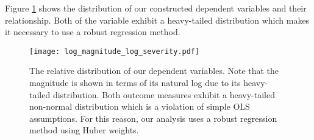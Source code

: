 Figure \ref{log_magnitude_log_severity} shows the distribution of our constructed dependent variables and their relationship. Both of the variable exhibit a heavy-tailed distribution which makes it necessary to use a robust regression method.

\begin{figure}
\centering
\texttt{[image: log\_magnitude\_log\_severity.pdf]}
\label{log_magnitude_log_severity}
\caption{The relative distribution of our dependent variables. Note that the magnitude is shown in terms of its natural log due to its heavy-tailed distribution. Both outcome measures exhibit a heavy-tailed non-normal distribution which is a violation of simple OLS assumptions. For this reason, our analysis uses a robust regression method using Huber weights.}
\end{figure}